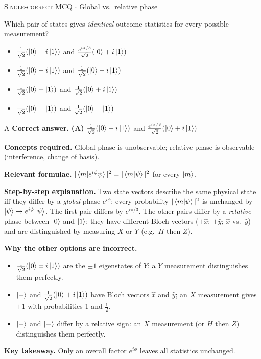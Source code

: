 \documentclass[11pt,a4paper]{article}
\newcommand{\optlabel}[1]{\textbf{(#1)}}
\newcommand{\correctlabel}[1]{\textcolor{okgreen}{\textbf{(#1)}\,\ding{51}}}
\newenvironment{qitem}[1]{\begin{list}{}{\setlength{\leftmargin}{3.3em}\setlength{\labelwidth}{3.1em}%
  \setlength{\labelsep}{0.2em}\setlength{\topsep}{3pt}\setlength{\parsep}{3pt}}\item[\textbf{Q.#1}\hfill]}{\end{list}}
\newcommand{\qsep}{\par\vspace{2pt}{\color{black!15}\hrule}\vspace{4pt}}
\newcommand{\qmeta}[2]{{\footnotesize\color{black!60}\textsc{#1} \;$\cdot$\; #2}\par}
\begin{document}
\begin{qitem}{30}
\qmeta{Single-correct MCQ}{Global vs.\ relative phase}
Which pair of states gives \emph{identical} outcome statistics for every possible measurement?
\begin{itemize}[leftmargin=2.6em, labelsep=0.4em, itemsep=2pt, topsep=3pt]
\item[\correctlabel{A}] $\frac{1}{\sqrt2}(\ket0 + i\ket1)$ and $\frac{e^{i\pi/3}}{\sqrt2}(\ket0 + i\ket1)$
\item[\optlabel{B}] $\frac{1}{\sqrt2}(\ket0 + i\ket1)$ and $\frac{1}{\sqrt2}(\ket0 - i\ket1)$
\item[\optlabel{C}] $\frac{1}{\sqrt2}(\ket0 + \ket1)$ and $\frac{1}{\sqrt2}(\ket0 + i\ket1)$
\item[\optlabel{D}] $\frac{1}{\sqrt2}(\ket0 + \ket1)$ and $\frac{1}{\sqrt2}(\ket0 - \ket1)$
\end{itemize}
\end{qitem}
\begin{solbox}{A}
\textbf{\color{brand}Correct answer.} \textcolor{okgreen}{\textbf{(A)}} $\frac{1}{\sqrt2}(\ket0 + i\ket1)$ and $\frac{e^{i\pi/3}}{\sqrt2}(\ket0 + i\ket1)$

\textbf{\color{brand}Concepts required.} Global phase is unobservable; relative phase is observable (interference, change of basis).

\textbf{\color{brand}Relevant formulae.} $|\braket{m|e^{i\phi}\psi}|^2 = |\braket{m|\psi}|^2$ for every $\ket m$.

\textbf{\color{brand}Step-by-step explanation.} Two state vectors describe the same physical state iff they differ by a \emph{global} phase $e^{i\phi}$: every probability
$|\braket{m|\psi}|^2$ is unchanged by $\ket\psi \to e^{i\phi}\ket\psi$. The first pair differs by $e^{i\pi/3}$.
The other pairs differ by a \emph{relative} phase between $\ket0$ and $\ket1$: they have different Bloch vectors
($\pm\hat x$; $\pm\hat y$; $\hat x$ vs.\ $\hat y$) and are distinguished by measuring $X$ or $Y$ (e.g.\ $H$ then $Z$).

\textbf{\color{brand}Why the other options are incorrect.}
\begin{itemize}[leftmargin=2.4em, itemsep=1pt, topsep=2pt]
\item[\textbf{(B)}] $\frac{1}{\sqrt2}(\ket0 \pm i\ket1)$ are the $\pm1$ eigenstates of $Y$: a $Y$ measurement distinguishes them perfectly.
\item[\textbf{(C)}] $\ket+$ and $\frac{1}{\sqrt2}(\ket0 + i\ket1)$ have Bloch vectors $\hat x$ and $\hat y$; an $X$ measurement gives $+1$ with probabilities 1 and $\frac12$.
\item[\textbf{(D)}] $\ket+$ and $\ket-$ differ by a relative sign: an $X$ measurement (or $H$ then $Z$) distinguishes them perfectly.
\end{itemize}
\textbf{\color{brand}Key takeaway.} Only an overall factor $e^{i\phi}$ leaves all statistics unchanged.
\end{solbox}
\qsep
\end{document}
